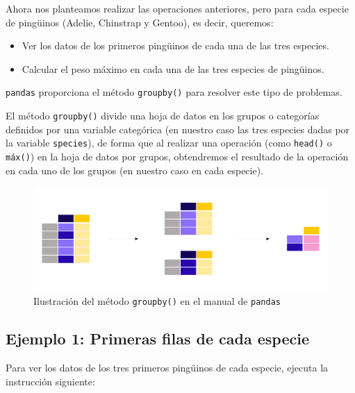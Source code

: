 \documentclass[
  a4paper,
  noprof,
  12pt,
  notoc,
  nosols,
  nobib]{mnye}
\providecommand{\tightlist}{%
  \setlength{\itemsep}{0pt}\setlength{\parskip}{0pt}}\usepackage{longtable,booktabs,array}
\theoremstyle{definition}
\theoremstyle{remark}
\begin{document}
Ahora nos planteamos realizar las operaciones anteriores, pero para cada
especie de pingüinos (Adelie, Chinstrap y Gentoo), es decir, queremos:

\begin{itemize}
\tightlist
\item
  Ver los datos de los primeros pingüinos de cada una de las tres
  especies.
\item
  Calcular el peso máximo en cada una de las tres especies de pingüinos.
\end{itemize}

\texttt{pandas} proporciona el método \texttt{groupby()} para resolver
este tipo de problemas.

El método \texttt{groupby()} divide una hoja de datos en los grupos o
categorías definidos por una variable categórica (en nuestro caso las
tres especies dadas por la variable \texttt{species}), de forma que al
realizar una operación (como \texttt{head()} o \texttt{máx()}) en la
hoja de datos por grupos, obtendremos el resultado de la operación en
cada uno de los grupos (en nuestro caso en cada especie).

\begin{figure}[tbph]

{\centering \includegraphics{index_files/mediabag/chapters/../img/06_groupby.pdf}

}

\caption{Ilustración del método \texttt{groupby()} en el manual de
\texttt{pandas}}

\end{figure}%

\subsection*{Ejemplo 1: Primeras filas de cada
especie}\label{ejemplo-1-primeras-filas-de-cada-especie}


Para ver los datos de los tres primeros pingüinos de cada especie,
ejecuta la instrucción siguiente:
\end{document}
